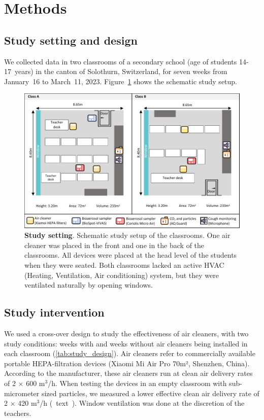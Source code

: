 \documentclass[fleqn,11pt]{wlscirep}
\begin{document}
\newpage

\section*{Methods}

\subsection*{Study setting and design} 

\noindent We collected data in two classrooms of a secondary school (age of students 14-17~years) in the canton of Solothurn, Switzerland, for seven weeks from January~16 to March~11, 2023. Figure~\ref{fig:study-setup} shows the schematic study setup. 

\begin{figure}[!htpb]
    \centering
    \includegraphics{../study_setting.pdf}
    \caption{\textbf{Study setting}. Schematic study setup of the classrooms. One air cleaner was placed in the front and one in the back of the classrooms. All devices were placed at the head level of the students when they were seated. Both classrooms lacked an active HVAC (Heating, Ventilation, Air conditioning) system, but they were ventilated naturally by opening windows. }
    \label{fig:study-setup}
\end{figure}

\subsection*{Study intervention} 

\noindent We used a cross-over design to study the effectiveness of air cleaners, with two study conditions: weeks with and weeks without air cleaners being installed in each classroom (\cref{tab:study_design}). Air cleaners refer to commercially available portable HEPA-filtration devices (Xiaomi Mi Air Pro 70m², Shenzhen, China). According to the manufacturer, these air cleaners run at clean air delivery rates of 2$\,\times\,$600 m$^{3}$/h. When testing the devices in an empty classroom with sub-micrometer sized particles, we measured a lower effective clean air delivery rate of 2$\,\times\,$420 m$^{3}$/h (\supp~text~). Window ventilation was done at the discretion of the teachers.
\end{document}
